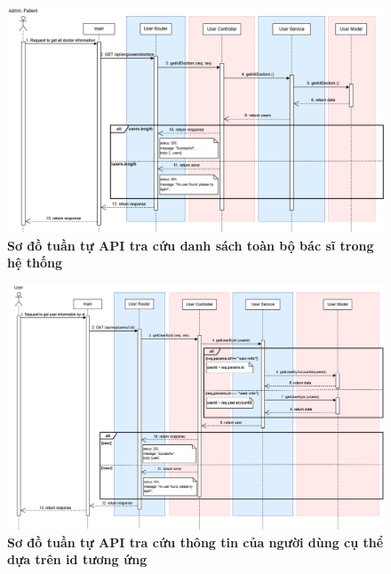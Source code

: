 \begin{figure}[H]
	\centering
	\includegraphics[width=16cm]{Images/api_sequence/user/getAllDoctors.drawio.png}
	\caption[Sơ đồ tuần tự API tra cứu danh sách toàn bộ bác sĩ trong hệ thống]{\bfseries \fontsize{12pt}{0pt}\selectfont Sơ đồ tuần tự API tra cứu danh sách toàn bộ bác sĩ trong hệ thống}
	\label{sequence_diagram_get_all_doctors}
\end{figure}

\begin{figure}[H]
	\centering
	\includegraphics[width=16cm]{Images/api_sequence/user/getUserById.drawio.png}
	\caption[Sơ đồ tuần tự API tra cứu của thông tin người dùng cụ thể dựa trên id tương ứng]{\bfseries \fontsize{12pt}{0pt}\selectfont Sơ đồ tuần tự API tra cứu thông tin của người dùng cụ thể dựa trên id tương ứng}
	\label{sequence_diagram_get_user_by_id}
\end{figure}

